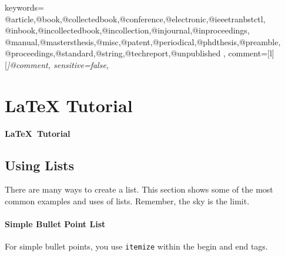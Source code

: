 {
    keywords={%
        @article,@book,@collectedbook,@conference,@electronic,@ieeetranbstctl,%
        @inbook,@incollectedbook,@incollection,@injournal,@inproceedings,%
        @manual,@mastersthesis,@misc,@patent,@periodical,@phdthesis,@preamble,%
        @proceedings,@standard,@string,@techreport,@unpublished%
    },
    comment=[l][\itshape]{@comment},
    sensitive=false,
}




\chapter{{\LaTeX} Tutorial}
\pagebreak

\begin{center}
{\LARGE\textbf{\LaTeX\ Tutorial}}
\end{center}

\section{Using Lists}
\label{sec:using_lists}

There are many ways to create a list. This section shows some of the most common examples and uses of lists. Remember, the sky is the limit.

\subsubsection{Simple Bullet Point List}

For simple bullet points, you use \verb|itemize| within the begin and end tags. 


